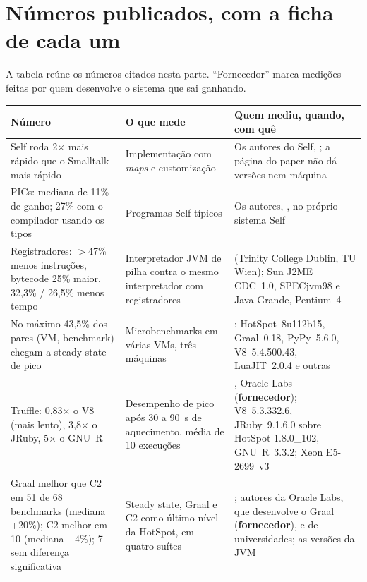 \section{Números publicados, com a ficha de cada um}
\label{sec:numeros-publicados}

A tabela reúne os números citados nesta parte. \enquote{Fornecedor}
marca medições feitas por quem desenvolve o sistema que sai ganhando.

\footnotesize
\begin{longtable}{@{}>{\raggedright\arraybackslash}p{3.6cm} >{\raggedright\arraybackslash}p{3.4cm} >{\raggedright\arraybackslash}p{5.2cm}@{}}
\toprule
Número & O que mede & Quem mediu, quando, com quê \\
\midrule \endhead
Self roda 2× mais rápido que o Smalltalk mais rápido &
  Implementação com \emph{maps} e customização & Os autores do Self,
  \textcite{paper:self-efficient-impl}; a página do paper não dá
  versões nem máquina \\
\addlinespace
PICs: mediana de 11\% de ganho; 27\% com o compilador usando os tipos
  & Programas Self típicos & Os autores,
  \textcite{paper:self-pics}, no próprio sistema Self \\
\addlinespace
Registradores: $>$47\% menos instruções, bytecode 25\% maior, 32,3\% /
  26,5\% menos tempo & Interpretador JVM de pilha contra o mesmo
  interpretador com registradores & \textcite{paper:vm-showdown}
  (Trinity College Dublin, TU Wien); Sun J2ME CDC~1.0, SPECjvm98 e Java
  Grande, Pentium~4 \\
\addlinespace
No máximo 43,5\% dos pares (VM, benchmark) chegam a steady state de pico
  & Microbenchmarks em várias VMs, três máquinas &
  \textcite{paper:vm-warmup-hot-cold}; HotSpot~8u112b15, Graal~0.18,
  PyPy~5.6.0, V8~5.4.500.43, LuaJIT~2.0.4 e outras \\
\addlinespace
Truffle: 0,83× o V8 (mais lento), 3,8× o JRuby, 5× o GNU~R & Desempenho de pico após
  30 a 90~s de aquecimento, média de 10 execuções &
  \textcite{paper:truffle-partial-evaluation}, Oracle Labs
  (\textbf{fornecedor}); V8~5.3.332.6, JRuby~9.1.6.0 sobre HotSpot
  1.8.0\_102, GNU~R~3.3.2; Xeon E5-2699~v3 \\
\addlinespace
Graal melhor que C2 em 51 de 68 benchmarks (mediana +20\%); C2 melhor em
  10 (mediana $-$4\%); 7 sem diferença significativa & Steady state, Graal
  e C2 como último nível da HotSpot, em quatro suítes &
  \textcite{paper:renaissance}; autores da Oracle Labs, que desenvolve o
  Graal (\textbf{fornecedor}), e de universidades; as versões da JVM

\end{longtable}
